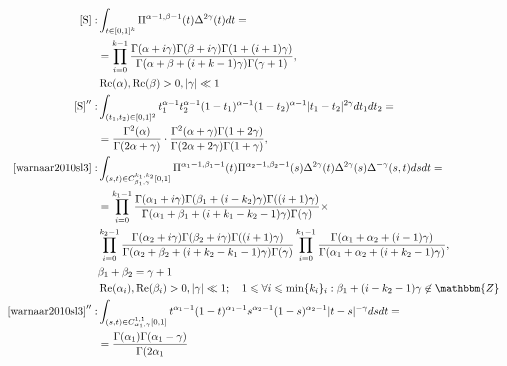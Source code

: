 \documentclass{article}
\newcommand{\nin}{\not\in}
\newcommand{\tmop}[1]{\ensuremath{\operatorname{#1}}}
\begin{document}
\begin{eqnarray}
  \left[ \mathrm{S} \right] : & \int_{t \in [0, 1]^k} \Pi^{\alpha - 1, \beta -
  1} (t) \Delta^{2 \gamma} (t) d t = &  \nonumber\\
  & = \prod_{i = 0}^{k - 1} \frac{\Gamma (\alpha + i \gamma) \Gamma (\beta +
  i \gamma) \Gamma (1 + (i + 1) \gamma)}{\Gamma (\alpha + \beta + (i + k - 1)
  \gamma) \Gamma (\gamma + 1)}, &  \nonumber\\
  & \tmop{Re} (\alpha), \tmop{Re} (\beta) > 0, | \gamma | \ll 1 & 
  \nonumber\\
  \left[ \mathrm{S} \right]'' : & \int_{(t_1, t_2) \in [0, 1]^2} t_1^{\alpha -
  1} t_2^{\alpha - 1} (1 - t_1)^{\alpha - 1} (1 - t_2)^{\alpha - 1} | t_1 -
  t_2 |^{2 \gamma} d t_1 d t_2 = &  \nonumber\\
  & = \frac{\Gamma^2 (\alpha)}{\Gamma (2 \alpha + \gamma)} \cdot
  \frac{\Gamma^2 (\alpha + \gamma) \Gamma (1 + 2 \gamma)}{\Gamma (2 \alpha + 2
  \gamma) \Gamma (1 + \gamma)}, &  \nonumber\\
  \mathrm{{\cite[(1.4)]{warnaar2010sl3}}:} & \int_{(s, t) \in C_{\beta_1,
  \gamma}^{k_1, k_2} [0, 1]} \Pi^{\alpha_1 - 1, \beta_1 - 1} (t) \Pi^{\alpha_2
  - 1, \beta_2 - 1} (s) \Delta^{2 \gamma} (t) \Delta^{2 \gamma} (s) \Delta^{-
  \gamma} (s, t) d s d t = &  \nonumber\\
  & = \prod_{i = 0}^{k_1 - 1} \frac{\Gamma (\alpha_1 + i \gamma) \Gamma
  (\beta_1 + (i - k_2) \gamma) \Gamma ((i + 1) \gamma)}{\Gamma (\alpha_1 +
  \beta_1 + (i + k_1 - k_2 - 1) \gamma) \Gamma (\gamma)} \times &  \nonumber\\
  & \prod_{i = 0}^{k_2 - 1} \frac{\Gamma (\alpha_2 + i \gamma) \Gamma
  (\beta_2 + i \gamma) \Gamma ((i + 1) \gamma)}{\Gamma (\alpha_2 + \beta_2 +
  (i + k_2 - k_1 - 1) \gamma) \Gamma (\gamma)} \prod_{i = 0}^{k_1 - 1}
  \frac{\Gamma (\alpha_1 + \alpha_2 + (i - 1) \gamma)}{\Gamma (\alpha_1 +
  \alpha_2 + (i + k_2 - 1) \gamma)}, &  \nonumber\\
  & \beta_1 + \beta_2 = \gamma + 1 &  \nonumber\\
  & \tmop{Re} (\alpha_i), \tmop{Re} (\beta_i) > 0, | \gamma | \ll 1 ; \quad 1
  \leqslant \forall i \leqslant \min \{ k_i \}_i : \beta_1 + (i - k_2 - 1)
  \gamma \nin \mathbbm{Z} &  \nonumber\\
  \mathrm{{\cite{warnaar2010sl3}}}'' : & \int_{(s, t) \in C_{\alpha_1,
  \gamma}^{1, 1} [0, 1]} t^{\alpha_1 - 1} (1 - t)^{\alpha_1 - 1} s^{\alpha_2 -
  1} (1 - s)^{\alpha_2 - 1} | t - s |^{- \gamma} d s d t = &  \nonumber\\
  & = \frac{\Gamma (\alpha_1) \Gamma (\alpha_1 - \gamma)}{\Gamma (2 \alpha_1
}
\end{eqnarray}
\end{document}
